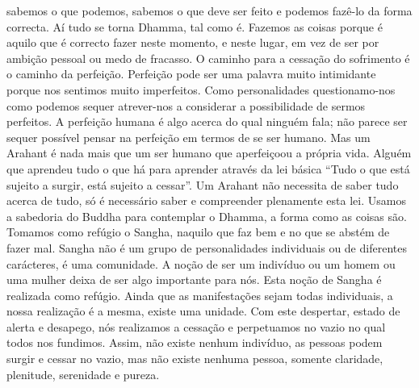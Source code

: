 sabemos o que podemos, sabemos o que deve ser feito e
podemos fazê-lo da forma correcta. Aí tudo se torna
Dhamma, tal como é. Fazemos as coisas porque é aquilo que
é correcto fazer neste momento, e neste lugar, em vez de ser
por ambição pessoal ou medo de fracasso.
O caminho para a cessação do sofrimento é o caminho da
perfeição. Perfeição pode ser uma palavra muito intimidante
porque nos sentimos muito imperfeitos. Como personalidades
questionamo-nos como podemos sequer atrever-nos a
considerar a possibilidade de sermos perfeitos. A perfeição
humana é algo acerca do qual ninguém fala; não parece ser
sequer possível pensar na perfeição em termos de se ser
humano. Mas um Arahant é nada mais que um ser humano
que aperfeiçoou a própria vida. Alguém que aprendeu tudo
o que há para aprender através da lei básica “Tudo o que
está sujeito a surgir, está sujeito a cessar”. Um Arahant não
necessita de saber tudo acerca de tudo, só é necessário saber
e compreender plenamente esta lei.
Usamos a sabedoria do Buddha para contemplar o
Dhamma, a forma como as coisas são. Tomamos como refúgio
o Sangha, naquilo que faz bem e no que se abstém de fazer
mal. Sangha não é um grupo de personalidades individuais ou
de diferentes carácteres, é uma comunidade. A noção de ser
um indivíduo ou um homem ou uma mulher deixa de ser algo
importante para nós. Esta noção de Sangha é realizada como
refúgio. Ainda que as manifestações sejam todas individuais,
a nossa realização é a mesma, existe uma unidade. Com este
despertar, estado de alerta e desapego, nós realizamos a cessação e perpetuamos no vazio no qual todos nos fundimos.
Assim, não existe nenhum indivíduo, as pessoas podem surgir
e cessar no vazio, mas não existe nenhuma pessoa, somente
claridade, plenitude, serenidade e pureza.


